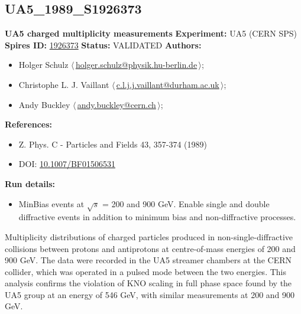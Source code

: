 \clearpage

\subsection[UA5\_1989\_S1926373]{UA5\_1989\_S1926373\,\cite{Ansorge:1988kn}}
\textbf{UA5 charged multiplicity measurements}\newline
\textbf{Experiment:} UA5 (CERN SPS) \newline
\textbf{Spires ID:} \href{http://www.slac.stanford.edu/spires/find/hep/www?rawcmd=key+1926373}{1926373}\newline
\textbf{Status:} VALIDATED\newline
\textbf{Authors:}
\begin{itemize}
  \item Holger Schulz $\langle\,$\href{mailto:holger.schulz@physik.hu-berlin.de}{holger.schulz@physik.hu-berlin.de}$\,\rangle$;
  \item Christophe L. J. Vaillant $\langle\,$\href{mailto:c.l.j.j.vaillant@durham.ac.uk}{c.l.j.j.vaillant@durham.ac.uk}$\,\rangle$;
  \item Andy Buckley $\langle\,$\href{mailto:andy.buckley@cern.ch}{andy.buckley@cern.ch}$\,\rangle$;
\end{itemize}
\textbf{References:}
\begin{itemize}
  \item Z. Phys. C - Particles and Fields 43, 357-374 (1989)
  \item DOI: \href{http://dx.doi.org/10.1007/BF01506531}{10.1007/BF01506531}
\end{itemize}
\textbf{Run details:}
\begin{itemize}

  \item MinBias events at \ensuremath{\sqrt{s}} = 200 and 900 GeV. Enable single and double diffractive events in addition to minimum bias and non-diffractive processes.\end{itemize}

\noindent Multiplicity distributions of charged particles produced in non-single-diffractive  collisions between protons and antiprotons at centre-of-mass energies of 200 and  900 GeV. The data were recorded in the UA5 streamer chambers at the CERN collider,  which was operated in a pulsed mode between the two energies. This analysis confirms the violation of KNO scaling in full phase space found by the UA5 group  at an energy of 546 GeV, with similar measurements at 200 and 900 GeV.

